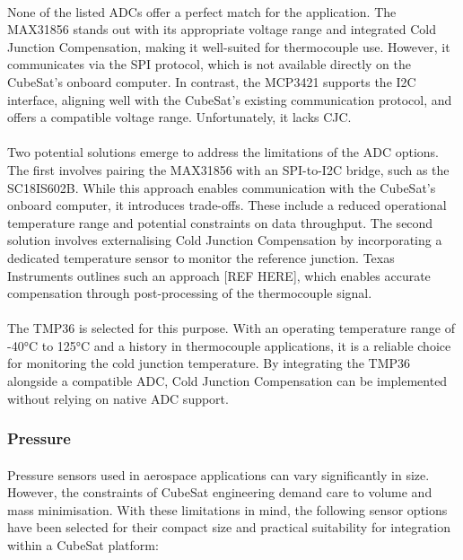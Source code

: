 \documentclass[11pt]{article}
\begin{document}
	\paragraph{} \paragraph{}None of the listed ADCs offer a perfect match for the application. The MAX31856 stands out with its appropriate voltage range and integrated Cold Junction Compensation, making it well-suited for thermocouple use. However, it communicates via the SPI protocol, which is not available directly on the CubeSat's onboard computer. In contrast, the MCP3421 supports the I2C interface, aligning well with the CubeSat’s existing communication protocol, and offers a compatible voltage range. Unfortunately, it lacks CJC.
	
	\paragraph{}Two potential solutions emerge to address the limitations of the ADC options. The first involves pairing the MAX31856 with an SPI-to-I2C bridge, such as the SC18IS602B. While this approach enables communication with the CubeSat's onboard computer, it introduces trade-offs. These include a reduced operational temperature range and potential constraints on data throughput. The second solution involves externalising Cold Junction Compensation by incorporating a dedicated temperature sensor to monitor the reference junction. Texas Instruments outlines such an approach [REF HERE], which enables accurate compensation through post-processing of the thermocouple signal.
	
	\paragraph{}The TMP36 is selected for this purpose. With an operating temperature range of -40°C to 125°C and a history in thermocouple applications, it is a reliable choice for monitoring the cold junction temperature. By integrating the TMP36 alongside a compatible ADC, Cold Junction Compensation can be implemented without relying on native ADC support.
	
	\subsubsection{Pressure}
	
	\paragraph{}Pressure sensors used in aerospace applications can vary significantly in size. However, the constraints of CubeSat engineering demand care to volume and mass minimisation. With these limitations in mind, the following sensor options have been selected for their compact size and practical suitability for integration within a CubeSat platform:
	
\end{document}
